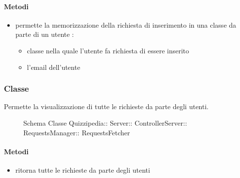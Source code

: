 \paragraph{Metodi}
\begin{itemize}
\item {}
\newline
permette la memorizzazione della richiesta di inserimento in una classe da parte di un utente
\newline
{} :
\begin{itemize}
\item {}
\newline
classe nella quale l'utente fa richiesta di essere inserito
\item {}
\newline
l'email dell'utente
\end{itemize}
\end{itemize}
\subsubsection{Classe }
Permette la visualizzazione di tutte le richieste da parte degli utenti.
\begin{figure}[H]
\centering
\noindent{}
\caption[Schema Classe RequestsFetcher]{Schema Classe Quizzipedia:: Server:: ControllerServer:: RequestsManager:: RequestsFetcher}
\end{figure}
\paragraph{Metodi}
\begin{itemize}
\item {}
\newline
ritorna tutte le richieste da parte degli utenti
\newline
\end{itemize}
